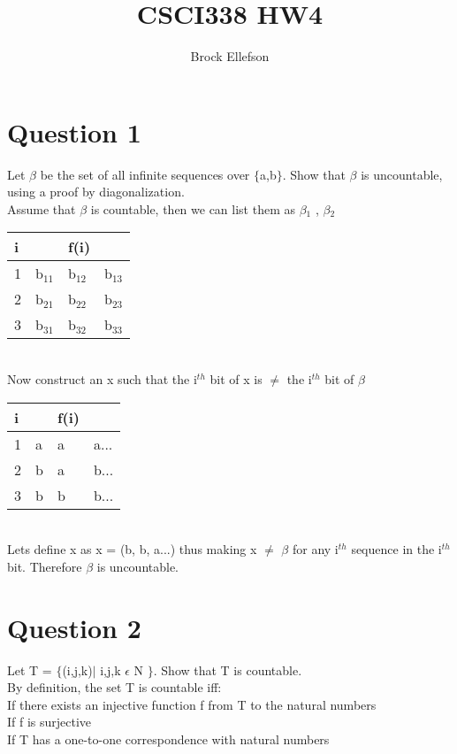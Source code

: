 \documentclass[10pt,a4paper]{article}
\author{Brock Ellefson}
\title{CSCI338 HW4}
\begin{document}
\maketitle
\section*{Question 1}
Let $\beta$ be the set of all infinite sequences over $\lbrace$a,b$\rbrace$. Show that $\beta$ is uncountable,
using a proof by diagonalization.\\
Assume that $\beta$ is countable, then we can list them as $\beta$$_{1}$ , $\beta$$_{2}$
\begin{table}[h]
\centering
\begin{tabular}{l|lll}
i & {\ul } & f(i) &     \\ \hline
1 & b$_{11}$    & b$_{12}$  & b$_{13}$ \\
2 & b$_{21}$    & b$_{22}$  & b$_{23}$ \\
3 & b$_{31}$    & b$_{32}$  & b$_{33}$
\end{tabular}
\end{table}
\\Now construct an x such that the i$^{th}$ bit of x is $\neq$ the i$^{th}$ bit of $\beta$
\begin{table}[h]
\centering
\begin{tabular}{l|lll}
i & {\ul } & f(i) &   \\ \hline
1 & a      & a & a... \\
2 & b      & a & b... \\
3 & b      & b & b...
\end{tabular}
\end{table}
\\Lets define x as x = (b, b, a...) thus making x $\neq$ $\beta$ for any i$^{th}$ sequence in the i$^{th}$ bit. Therefore $\beta$ is uncountable.

\section*{Question 2}
Let T = $\lbrace$(i,j,k)$\mid$ i,j,k $\epsilon$ N $\rbrace$. Show that T is countable.\\
By definition, the set T is countable iff:\\
If there exists an injective function f from T to the natural numbers\\
If f is surjective\\
If T has a one-to-one correspondence with natural numbers\\
\\
 
\end{document}
